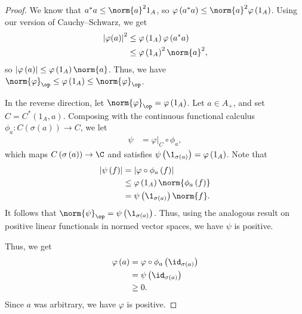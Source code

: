 \documentclass[10pt]{mypackage}
\begin{document}
\begin{proof}
  We know that $a^{\ast}a\leq \norm{a}^21_A$, so $\varphi\left(a^{\ast}a\right)\leq \norm{a}^2\varphi\left(1_A\right)$. Using our version of Cauchy--Schwarz, we get
  \begin{align*}
    \left\vert \varphi(a) \right\vert^2 &\leq \varphi\left(1_A\right)\varphi\left(a^{\ast}a\right)\\
                                        &\leq \varphi\left(1_A\right)^2\norm{a}^2,
  \end{align*}
  so $\left\vert \varphi\left(a\right) \right\vert\leq \varphi\left(1_A\right)\norm{a}$. Thus, we have $\norm{\varphi}_{\op}\leq \varphi\left(1_A\right)\leq \norm{\varphi}_{\op}$.\newline

  In the reverse direction, let $\norm{\varphi}_{\op} = \varphi\left(1_A\right)$. Let $a\in A_{+}$, and set $C = C^{\ast}\left(1_A,a\right)$. Composing with the continuous functional calculus $\phi_a\colon C\left(\sigma\left(a\right)\right)\rightarrow C$, we let
  \begin{align*}
    \psi &= \varphi|_{C}\circ \phi_a,
  \end{align*}
  which maps $C\left(\sigma\left(a\right)\right)\rightarrow \C$ and satisfies $\psi\left(\1_{\sigma\left(a\right)}\right) = \varphi\left(1_A\right)$. Note that
  \begin{align*}
    \left\vert \psi\left(f\right) \right\vert &= \left\vert \varphi\circ \phi_a\left(f\right) \right\vert\\
                                              &\leq \varphi\left(1_A\right)\norm{\phi_a\left(f\right)}\\
                                              &= \psi\left(\1_{\sigma\left(a\right)}\right)\norm{f}.
  \end{align*}
  It follows that $\norm{\psi}_{\op} = \psi\left(\1_{\sigma\left(a\right)}\right)$. Thus, using the analogous result on positive linear functionals in normed vector spaces, we have $\psi$ is positive.\newline

  Thus, we get
  \begin{align*}
    \varphi\left(a\right) &= \varphi\circ \phi_a\left(\id_{\sigma\left(a\right)}\right)\\
                          &= \psi\left(\id_{\sigma\left(a\right)}\right)\\
                          &\geq 0.
  \end{align*}
  Since $a$ was arbitrary, we have $\varphi$ is positive.
\end{proof}
\end{document}
